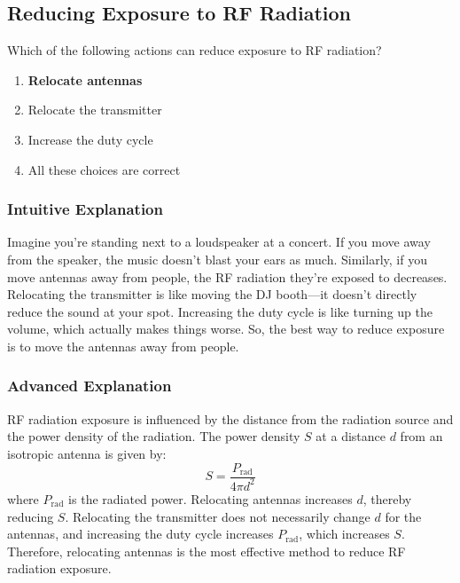 \subsection{Reducing Exposure to RF Radiation}
\label{T0C08}

\begin{tcolorbox}[colback=gray!10!white,colframe=black!75!black,title=T0C08]
Which of the following actions can reduce exposure to RF radiation?
\begin{enumerate}[label=\Alph*)]
    \item \textbf{Relocate antennas}
    \item Relocate the transmitter
    \item Increase the duty cycle
    \item All these choices are correct
\end{enumerate}
\end{tcolorbox}

\subsubsection{Intuitive Explanation}
Imagine you're standing next to a loudspeaker at a concert. If you move away from the speaker, the music doesn't blast your ears as much. Similarly, if you move antennas away from people, the RF radiation they're exposed to decreases. Relocating the transmitter is like moving the DJ booth—it doesn't directly reduce the sound at your spot. Increasing the duty cycle is like turning up the volume, which actually makes things worse. So, the best way to reduce exposure is to move the antennas away from people.

\subsubsection{Advanced Explanation}
RF radiation exposure is influenced by the distance from the radiation source and the power density of the radiation. The power density \( S \) at a distance \( d \) from an isotropic antenna is given by:
\[
S = \frac{P_{\text{rad}}}{4 \pi d^2}
\]
where \( P_{\text{rad}} \) is the radiated power. Relocating antennas increases \( d \), thereby reducing \( S \). Relocating the transmitter does not necessarily change \( d \) for the antennas, and increasing the duty cycle increases \( P_{\text{rad}} \), which increases \( S \). Therefore, relocating antennas is the most effective method to reduce RF radiation exposure.

